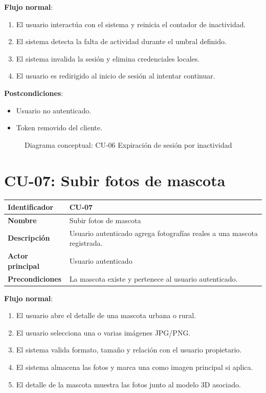 \documentclass[12pt,a4paper]{article}
\begin{document}
\vspace{0.5em}

\textbf{Flujo normal}:
\begin{enumerate}[leftmargin=*]
    \item El usuario interact\'ua con el sistema y reinicia el contador de inactividad.
    \item El sistema detecta la falta de actividad durante el umbral definido.
    \item El sistema invalida la sesi\'on y elimina credenciales locales.
    \item El usuario es redirigido al inicio de sesi\'on al intentar continuar.
\end{enumerate}

\textbf{Postcondiciones}:
\begin{itemize}[leftmargin=*]
    \item Usuario no autenticado.
    \item Token removido del cliente.
\end{itemize}

\begin{figure}[h]
\centering
{}
\caption{Diagrama conceptual: CU-06 Expiraci\'on de sesi\'on por inactividad}
\end{figure}

\newpage
\section{CU-07: Subir fotos de mascota}

\begin{tabular}{|p{3.5cm}|p{10cm}|}
\hline
\textbf{Identificador} & CU-07 \\
\hline
\textbf{Nombre} & Subir fotos de mascota \\
\hline
\textbf{Descripci\'on} & Usuario autenticado agrega fotograf\'ias reales a una mascota registrada. \\
\hline
\textbf{Actor principal} & Usuario autenticado \\
\hline
\textbf{Precondiciones} & La mascota existe y pertenece al usuario autenticado. \\
\hline
\end{tabular}

\vspace{0.5em}

\textbf{Flujo normal}:
\begin{enumerate}[leftmargin=*]
    \item El usuario abre el detalle de una mascota urbana o rural.
    \item El usuario selecciona una o varias im\'agenes JPG/PNG.
    \item El sistema valida formato, tama\~no y relaci\'on con el usuario propietario.
    \item El sistema almacena las fotos y marca una como imagen principal si aplica.
    \item El detalle de la mascota muestra las fotos junto al modelo 3D asociado.
\end{enumerate}
\end{document}
